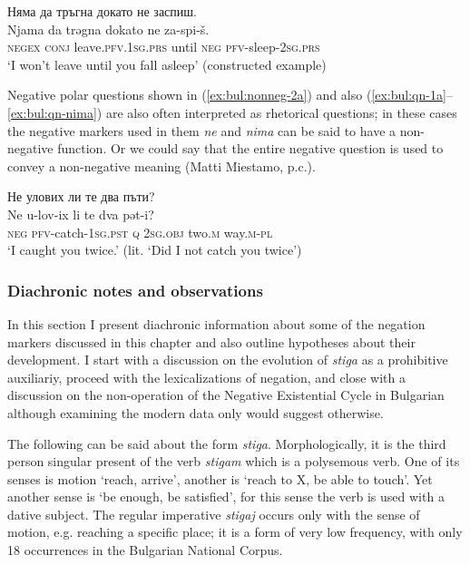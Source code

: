 \documentclass[output=paper,colorlinks=true, citecolor=brown]{langscibook}
\begin{document}
\ea Няма да тръгна докато не заспиш.\\ \label{ex:bul:nonneg-2} 
  	\gll Njama da trəgna dokato ne za-spi-š.\\
  	\textsc{negex} \textsc{conj} leave.\textsc{pfv.1sg.prs} until \textsc{neg} \textsc{pfv}-sleep-\textsc{2sg.prs}\\
\glt `I won't leave until you fall asleep' (constructed example) 
\z

Negative polar questions shown in (\ref{ex:bul:nonneg-2a}) and also (\ref{ex:bul:qn-1a}--\ref{ex:bul:qn-nima}) are also often interpreted as rhetorical questions; in these cases the negative markers used in them \textit{ne} and \textit{nima} can be said to have a non-negative function. Or we could say that the entire negative question is used to convey a non-negative meaning (Matti Miestamo, p.c.).

\ea Не улових ли те два пъти?\\ \label{ex:bul:nonneg-2a}
  	\gll Ne u-lov-ix li te dva pət-i?\\
     \textsc{neg} \textsc{pfv}-catch-\textsc{1sg.pst} \textsc{q} \textsc{2sg.obj} two.\textsc{m} way.\textsc{m}-\textsc{pl}\\
\glt `I caught you twice.' (lit. `Did I not catch you twice') \citep[492]{StojanovEtAl1983}
\z

\subsubsection{Diachronic notes and observations} \label{sec:bul:diachrony}
In this section I present diachronic information about some of the negation markers discussed in this chapter and also outline hypotheses about their development. I start with a discussion on the evolution of \textit{stiga} as a prohibitive auxiliariy, proceed with the lexicalizations of negation, and close with a discussion on the non-operation of the Negative Existential Cycle in Bulgarian although examining the modern data only would suggest otherwise.

The following can be said about the form \textit{stiga}. Morphologically, it is the third person singular present of the verb \textit{stigam} which is a polysemous verb. One of its senses is motion `reach, arrive', another is `reach to X, be able to touch'. Yet another sense is `be enough, be satisfied', for this sense the verb is used with a dative subject. The regular imperative \textit{stigaj} occurs only with the sense of motion, e.g. reaching a specific place; it is a form of very low frequency, with only 18 occurrences in the Bulgarian National Corpus. 
\end{document}
